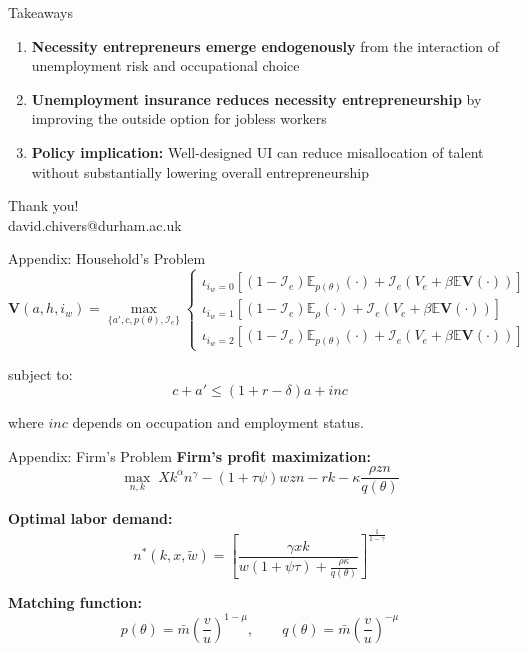 \documentclass[aspectratio=169, 11pt]{beamer}
\begin{document}
\begin{frame}{Takeaways}
    \begin{enumerate}
        \item \textbf{Necessity entrepreneurs emerge endogenously} from the interaction of unemployment risk and occupational choice
        \item \textbf{Unemployment insurance reduces necessity entrepreneurship} by improving the outside option for jobless workers
        \item \textbf{Policy implication:} Well-designed UI can reduce misallocation of talent without substantially lowering overall entrepreneurship
    \end{enumerate}

    \vspace{2em}

    \begin{center}
        \Large Thank you! \\[0.5em]
        \normalsize david.chivers@durham.ac.uk
    \end{center}
\end{frame}


\appendix

\begin{frame}[noframenumbering]{Appendix: Household's Problem}
    \small
    \[
        \mathbf{V}(a,h,i_w) = \max_{\{a',c,p(\theta),\mathcal{I}_e\}}
        \begin{cases}
            \iota_{i_w=0}\left[(1-\mathcal{I}_e)\mathbb{E}_{p(\theta)}(\cdot) + \mathcal{I}_e(V_e + \beta\mathbb{E}\mathbf{V}(\cdot))\right] \\
            \iota_{i_w=1}\left[(1-\mathcal{I}_e)\mathbb{E}_{\rho}(\cdot) + \mathcal{I}_e(V_e + \beta\mathbb{E}\mathbf{V}(\cdot))\right] \\
            \iota_{i_w=2}\left[(1-\mathcal{I}_e)\mathbb{E}_{p(\theta)}(\cdot) + \mathcal{I}_e(V_e + \beta\mathbb{E}\mathbf{V}(\cdot))\right]
        \end{cases}
    \]

    subject to:
    \[
        c + a' \leq (1 + r - \delta)a + inc
    \]

    where $inc$ depends on occupation and employment status.
\end{frame}

\begin{frame}[noframenumbering]{Appendix: Firm's Problem}
    \small
    \textbf{Firm's profit maximization:}
    \[
        \max_{n,k} \; X k^{\alpha} n^{\gamma} - (1+\tau\psi)wzn - rk - \kappa \frac{\rho z n}{q(\theta)}
    \]

    \textbf{Optimal labor demand:}
    \[
        n^*(k,x,\tilde{w}) = \left[\frac{\gamma x k}{w(1+\psi\tau) + \frac{\rho\kappa}{q(\theta)}}\right]^{\frac{1}{1-\gamma}}
    \]

    \textbf{Matching function:}
    \[
        p(\theta) = \bar{m}\left(\frac{v}{u}\right)^{1-\mu}, \qquad q(\theta) = \bar{m}\left(\frac{v}{u}\right)^{-\mu}
    \]
\end{frame}
\end{document}
